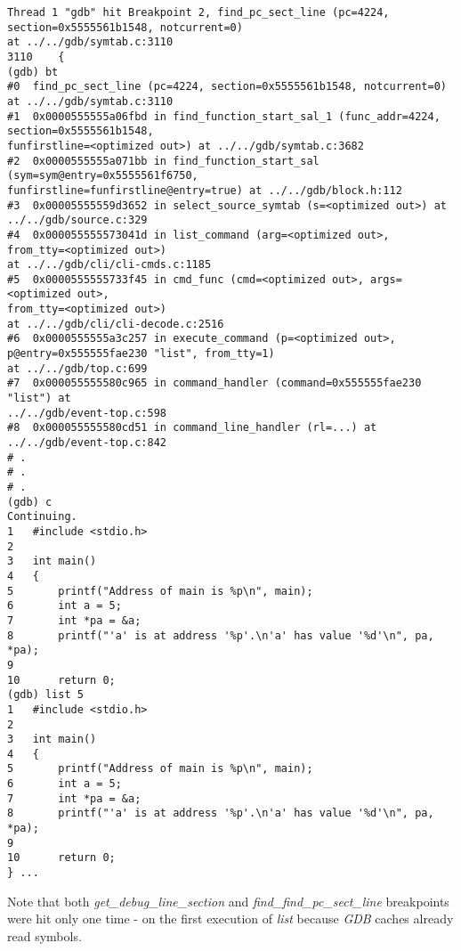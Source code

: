 \documentclass{report}
\begin{document}
\begin{verbatim}
Thread 1 "gdb" hit Breakpoint 2, find_pc_sect_line (pc=4224, 
section=0x5555561b1548, notcurrent=0)
at ../../gdb/symtab.c:3110
3110	{
(gdb) bt
#0  find_pc_sect_line (pc=4224, section=0x5555561b1548, notcurrent=0) 
at ../../gdb/symtab.c:3110
#1  0x0000555555a06fbd in find_function_start_sal_1 (func_addr=4224, 
section=0x5555561b1548, 
funfirstline=<optimized out>) at ../../gdb/symtab.c:3682
#2  0x0000555555a071bb in find_function_start_sal (sym=sym@entry=0x5555561f6750, 
funfirstline=funfirstline@entry=true) at ../../gdb/block.h:112
#3  0x00005555559d3652 in select_source_symtab (s=<optimized out>) at 
../../gdb/source.c:329
#4  0x000055555573041d in list_command (arg=<optimized out>, 
from_tty=<optimized out>)
at ../../gdb/cli/cli-cmds.c:1185
#5  0x0000555555733f45 in cmd_func (cmd=<optimized out>, args=<optimized out>, 
from_tty=<optimized out>)
at ../../gdb/cli/cli-decode.c:2516
#6  0x0000555555a3c257 in execute_command (p=<optimized out>, 
p@entry=0x555555fae230 "list", from_tty=1)
at ../../gdb/top.c:699
#7  0x000055555580c965 in command_handler (command=0x555555fae230 "list") at 
../../gdb/event-top.c:598
#8  0x000055555580cd51 in command_line_handler (rl=...) at 
../../gdb/event-top.c:842
# .
# .
# .
(gdb) c
Continuing.
1	#include <stdio.h>
2	
3	int main()
4	{
5		printf("Address of main is %p\n", main);
6		int a = 5;
7		int *pa = &a;
8		printf("'a' is at address '%p'.\n'a' has value '%d'\n", pa, *pa);
9	
10		return 0;
(gdb) list 5
1	#include <stdio.h>
2	
3	int main()
4	{
5		printf("Address of main is %p\n", main);
6		int a = 5;
7		int *pa = &a;
8		printf("'a' is at address '%p'.\n'a' has value '%d'\n", pa, *pa);
9	
10		return 0;
} ...
\end{verbatim}
Note that both \textit{get\_debug\_line\_section} and \textit{find\_find\_pc\_sect\_line} breakpoints were hit only one time - on the first execution of \textit{list} because \textit{GDB} caches already read symbols.
\end{document}
